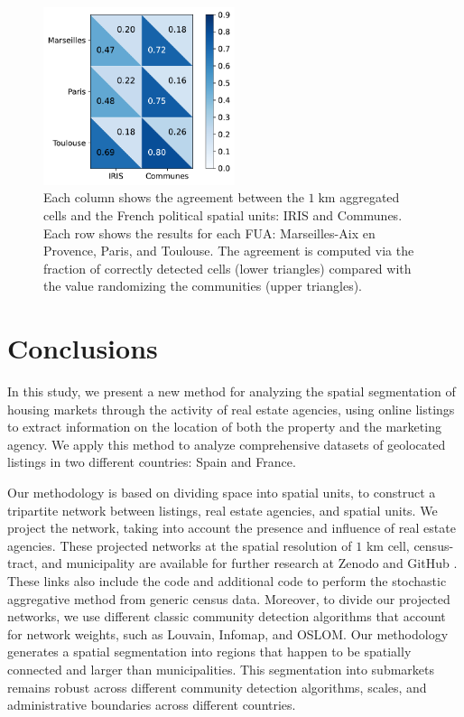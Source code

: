 \begin{figure}[t]
    \centering
    \includegraphics[width = 0.5\textwidth]{Figs/Idealista_segmentation/Cells_agreement_different_topologies_France.pdf}
	\caption[Comparison between the $1 \; \textrm{km}$ aggregated cells communities and the political units communities in France.]{ Each column shows the agreement between the $1 \; \textrm{km}$ aggregated cells and the French political spatial units: IRIS and Communes. Each row shows the results for each FUA: Marseilles-Aix en Provence, Paris, and Toulouse. The agreement is computed via the fraction of correctly detected cells (lower triangles) compared with the value randomizing the communities (upper triangles). \label{fig:Compare_france}}
\end{figure}


\section{Conclusions}
\label{sec:conclusions}

In this study, we present a new method for analyzing the spatial segmentation of housing markets through the activity of real estate agencies, using online listings to extract information on the location of both the property and the marketing agency. We apply this method to analyze comprehensive datasets of geolocated listings in two different countries: Spain and France. 

Our methodology is based on dividing space into spatial units, to construct a tripartite network between listings, real estate agencies, and spatial units. We project the network, taking into account the presence and influence of real estate agencies. These projected networks at the spatial resolution of $1$ km cell, census-tract, and municipality are available for further research at Zenodo \cite{zenodo-2024} and GitHub \cite{Abella-github-2024}. These links also include the code and additional code to perform the stochastic aggregative method from generic census data. Moreover, to divide our projected networks, we use different classic community detection algorithms that account for network weights, such as Louvain, Infomap, and OSLOM. Our methodology generates a spatial segmentation into regions that happen to be spatially connected and larger than municipalities. This segmentation into submarkets remains robust across different community detection algorithms, scales, and administrative boundaries across different countries.

